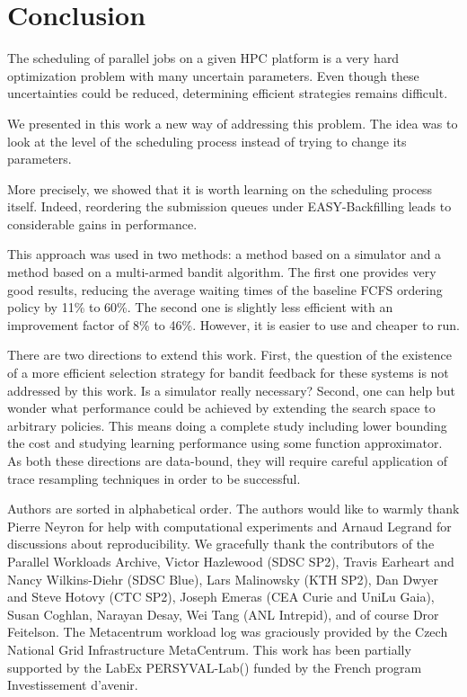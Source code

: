 \documentclass[sigconf,anonymous]{acmart}
\begin{document}
\section{Conclusion}
\label{sec:ccl}

The scheduling of parallel jobs on a given HPC platform is a very hard
optimization problem with many uncertain parameters. Even though these
uncertainties could be reduced, determining efficient strategies remains
difficult.

We presented in this work a new way of addressing this problem.  The idea was
to look at the level of the scheduling process instead of trying to change its
parameters.

More precisely, we showed that it is worth learning on the scheduling process
itself. Indeed, reordering the submission queues under EASY-Backfilling leads
to considerable gains in performance.

This approach was used in two methods: a method based on a simulator and a
method based on a multi-armed bandit algorithm. The first one provides very
good results, reducing the average waiting times of the baseline FCFS ordering
policy by 11\% to 60\%. The second one is slightly less efficient with an
improvement factor of 8\% to 46\%. However, it is easier to use and cheaper
to run.

There are two directions to extend this work.  First, the question of
the existence of a more efficient selection strategy for bandit feedback for
these systems is not addressed by this work. Is a simulator really necessary?
Second, one can help but wonder what performance could be achieved by extending
the search space to arbitrary policies. This means doing a complete study
including lower bounding the cost and studying learning performance using some
function approximator.
As both these directions are data-bound, they will require careful application of
trace resampling techniques in order to be successful.

\begin{acks}

Authors are sorted in alphabetical order. The authors would like to warmly
thank Pierre Neyron for help with computational experiments and Arnaud Legrand
for discussions about reproducibility. We gracefully thank the contributors of
the Parallel Workloads Archive, Victor Hazlewood (SDSC SP2), Travis Earheart
and Nancy Wilkins-Diehr (SDSC Blue), Lars Malinowsky (KTH SP2), Dan Dwyer and
Steve Hotovy (CTC SP2), Joseph Emeras (CEA Curie and UniLu Gaia), Susan
Coghlan, Narayan Desay, Wei Tang (ANL Intrepid), and of course Dror Feitelson.
The Metacentrum workload log was graciously provided by the Czech National Grid
Infrastructure MetaCentrum. This work has been partially supported by the LabEx
PERSYVAL-Lab() funded by
the French program Investissement d'avenir.
\end{acks}
\end{document}
